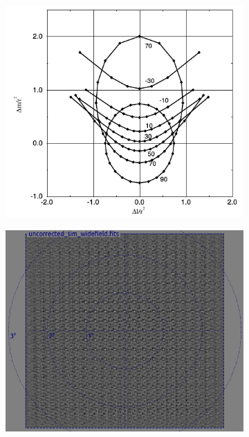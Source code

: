 \begin{figure}[ht!]
  \begin{mdframed}
    \centering
    \begin{subfigure}[b]{0.62\textwidth}
      \centering
      \includegraphics[width=\textwidth]{images/apparent_position_shifts.png}
      \caption{}
    \end{subfigure}
    \begin{subfigure}[b]{0.49\textwidth}
      \centering
      \includegraphics[width=\textwidth]{images/widefield_meerkat.png}

\end{subfigure}
\end{mdframed}
\end{figure}
